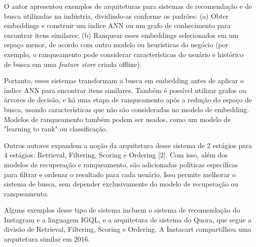 \documentclass[
	12pt,				%
	openright,			%
	oneside,			%
	a4paper,			%
	english,			%
	french,				%
	spanish,			%
	brazil				%
	]{abntex2}
\begin{document}
O autor \citeauthor{yan2021system} apresentou exemplos de arquiteturas para sistemas de recomendação e de busca
utilizadas na indústria,
dividindo-as conforme os padrões: (a) Obter embeddings e construir um índice ANN ou um grafo de conhecimento para
encontrar itens similares; (b) Ranquear esses embeddings selecionados em um espaço menor, de acordo com outro modelo
ou heurísticas do negócio (por exemplo, o ranqueamento pode considerar características do usuário e histórico de busca
em uma \textit{feature store} criada offline).

Portanto, esses sistemas transformam a busca em embedding antes de aplicar o índice ANN para encontrar itens similares.
Também é possível utilizar grafos ou árvores de decisão, e há uma etapa de ranqueamento após a redução do espaço de
busca, usando características que não são consideradas no modelo de embedding. Modelos de ranqueamento também podem
ser usados, como um modelo de "learning to rank" ou classificação.

Outros autores expandem a noção da arquitetura desse sistema de 2 estágios para 4 estágios: Retrieval, Filtering,
Scoring e Ordering [2].
Com isso, além dos modelos de recuperação e ranqueamento, são adicionadas políticas
específicas para filtrar e ordenar o resultado para cada usuário. Isso permite melhorar o sistema de busca,
sem depender exclusivamente do modelo de recuperação ou ranqueamento.

Alguns exemplos desse tipo de sistema incluem o sistema de recomendação do Instagram e a linguagem IGQL, e a
arquitetura de sistema do Quora, que segue a divisão de Retrieval, Filtering, Scoring e Ordering. A Instacart
compartilhou uma arquitetura similar em 2016.



\end{document}
